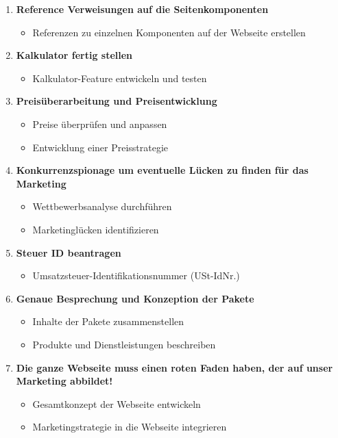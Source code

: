 \documentclass{article}
\begin{document}
\begin{enumerate}
    \item \textbf{Reference Verweisungen auf die Seitenkomponenten}
    \begin{itemize}
        \item Referenzen zu einzelnen Komponenten auf der Webseite erstellen
    \end{itemize}

    \item \textbf{Kalkulator fertig stellen}
    \begin{itemize}
        \item Kalkulator-Feature entwickeln und testen
    \end{itemize}

    \item \textbf{Preisüberarbeitung und Preisentwicklung}
    \begin{itemize}
        \item Preise überprüfen und anpassen
        \item Entwicklung einer Preisstrategie
    \end{itemize}

    \item \textbf{Konkurrenzspionage um eventuelle Lücken zu finden für das Marketing}
    \begin{itemize}
        \item Wettbewerbsanalyse durchführen
        \item Marketinglücken identifizieren
    \end{itemize}

    \item \textbf{Steuer ID beantragen}
    \begin{itemize}
        \item Umsatzsteuer-Identifikationsnummer (USt-IdNr.)
    \end{itemize}

    \item \textbf{Genaue Besprechung und Konzeption der Pakete}
    \begin{itemize}
        \item Inhalte der Pakete zusammenstellen
        \item Produkte und Dienstleistungen beschreiben
    \end{itemize}

    \item \textbf{Die ganze Webseite muss einen roten Faden haben, der auf unser Marketing abbildet!}
    \begin{itemize}
        \item Gesamtkonzept der Webseite entwickeln
        \item Marketingstrategie in die Webseite integrieren
    \end{itemize}
\end{enumerate}
\end{document}
